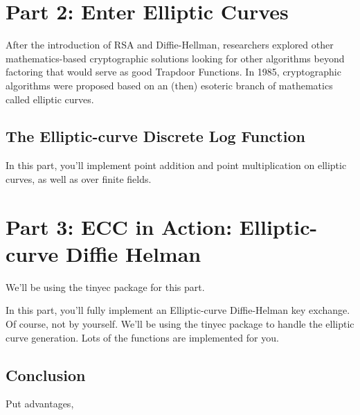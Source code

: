 \documentclass{article}
\begin{document}
\section*{Part 2: Enter Elliptic Curves}

After the introduction of RSA and Diffie-Hellman, researchers explored other mathematics-based cryptographic solutions looking for other algorithms beyond factoring that would serve as good Trapdoor Functions. In 1985, cryptographic algorithms were proposed based on an (then) esoteric branch of mathematics called elliptic curves.


\subsection*{The Elliptic-curve Discrete Log Function}




\begin{tcolorbox}
    In this part, you'll implement point addition and point multiplication on elliptic curves, as well as over finite fields.
\end{tcolorbox}

\section*{Part 3: ECC in Action: Elliptic-curve Diffie Helman}

We'll be using the tinyec package for this part.


\begin{tcolorbox}
    In this part, you'll fully implement an Elliptic-curve Diffie-Helman key exchange. Of course, not by yourself. We'll be using the tinyec package to handle the elliptic curve generation. Lots of the functions are implemented for you.
\end{tcolorbox}


\subsection*{Conclusion}

Put advantages, 
\end{document}
